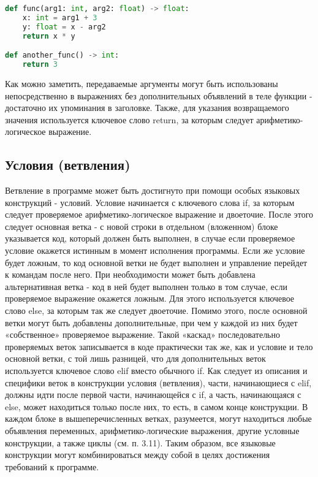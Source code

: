 \begin{lstlisting}[language=Python, caption=Пример кода на Python]
def func(arg1: int, arg2: float) -> float:
    x: int = arg1 + 3
    y: float = x - arg2
    return x * y

def another_func() -> int:
    return 3
\end{lstlisting}

Как можно заметить, передаваемые аргументы могут быть использованы непосредственно в выражениях без дополнительных объявлений в теле функции - достаточно их упоминания в заголовке. Также, для указания возвращаемого значения используется ключевое слово return, за которым следует арифметико-логическое выражение.

\subsection{Условия (ветвления)}

Ветвление в программе может быть достигнуто при помощи особых языковых конструкций - условий. Условие начинается с ключевого слова if, за которым следует проверяемое арифметико-логическое выражение и двоеточие. После этого следует основная ветка - с новой строки в отдельном (вложенном) блоке указывается код, который должен быть выполнен, в случае если проверяемое условие окажется истинным в момент исполнения программы. Если же условие будет ложным, то код основной ветки не будет выполнен и управление перейдет к командам после него.
При необходимости может быть добавлена альтернативная ветка - код в ней будет выполнен только в том случае, если проверяемое выражение окажется ложным. Для этого используется ключевое слово else, за которым так же следует двоеточие.
Помимо этого, после основной ветки могут быть добавлены дополнительные, при чем у каждой из них будет «собственное» проверяемое выражение. Такой «каскад» последовательно проверяемых веток записывается в коде практически так же, как и условие и тело основной ветки, с той лишь разницей, что для дополнительных веток используется ключевое слово elif вместо обычного if.
Как следует из описания и специфики веток в конструкции условия (ветвления), части, начинающиеся с elif, должны идти после первой части, начинающейся с if, а часть, начинающаяся с else, может находиться только после них, то есть, в самом конце конструкции. В каждом блоке в вышеперечисленных ветках, разумеется, могут находиться любые объявления переменных, арифметико-логические выражения, другие условные конструкции, а также циклы (см. п. 3.11). Таким образом, все языковые конструкции могут комбинироваться между собой в целях достижения требований к программе.

